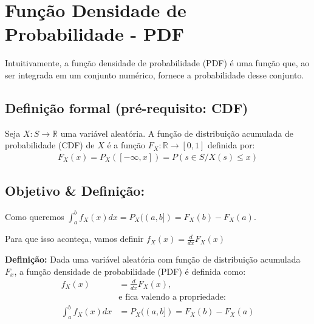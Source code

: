 \documentclass{article}
\begin{document}
\setlength{\abovedisplayskip}{12pt}
\setlength{\belowdisplayskip}{12pt}
\setlength{\abovedisplayshortskip}{0pt}
\setlength{\belowdisplayshortskip}{0pt}
\setlength{\jot}{0pt}

\section{Função Densidade de Probabilidade - PDF}
Intuitivamente, a função densidade de probabilidade (PDF) é uma função que, ao ser integrada em um
conjunto numérico, fornece a probabilidade desse conjunto.

\subsection{Definição formal (pré-requisito: CDF)}
Seja $X: S \rightarrow \mathbb{R}$ uma variável aleatória. A função de distribuição acumulada de
probabilidade (CDF) de $X$ é a função $F_X: \mathbb{R} \rightarrow [0,1]$ definida por:
\begin{align*}
    F_X(x) = P_X([-\infty, x]) = P(s \in S / X(s) \leq x)
\end{align*}

\subsection*{Objetivo \& Definição:}

Como queremos $\int^b_a f_X(x)dx = P_X((a,b]) = F_X(b) - F_X(a)$.

Para que isso aconteça, vamos definir $f_X(x) = \frac{d}{dx}F_X(x)$

\textbf{Definição:} Dada uma variável aleatória com função de distribuição acumulada $F_x$, a
função densidade de probabilidade (PDF) é definida como:
\begin{align*}
f_X(x) &= \frac{d}{dx}F_X(x), \\
       &\text{e fica valendo a propriedade:} \\
\int^b_a f_X(x)dx &= P_X((a,b]) = F_X(b) - F_X(a)
\end{align*}
\\[-1.5em]
\end{document}
